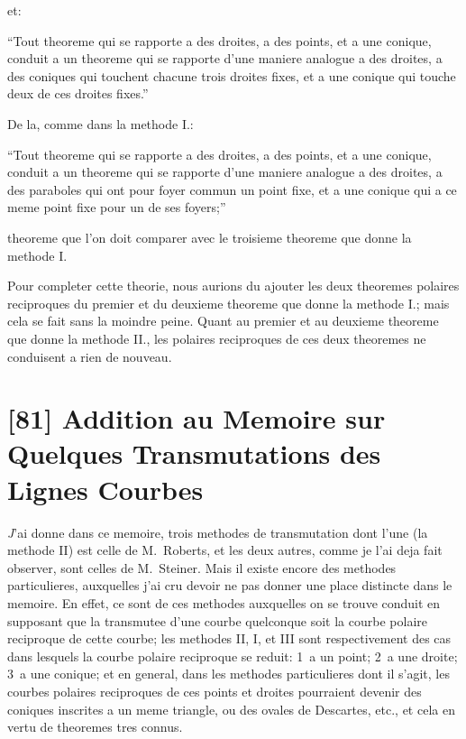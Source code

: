 \documentclass[12pt,a4paper]{article}
\begin{document}
et:

``Tout theoreme qui se rapporte a des droites, a des points, et a une conique, conduit a un theoreme qui se rapporte d'une maniere analogue a des droites, a des coniques qui touchent chacune trois droites fixes, et a une conique qui touche deux de ces droites fixes.''

De la, comme dans la methode I.:

``Tout theoreme qui se rapporte a des droites, a des points, et a une conique, conduit a un theoreme qui se rapporte d'une maniere analogue a des droites, a des paraboles qui ont pour foyer commun un point fixe, et a une conique qui a ce meme point fixe pour un de ses foyers;''

theoreme que l'on doit comparer avec le troisieme theoreme que donne la methode I.

Pour completer cette theorie, nous aurions du ajouter les deux theoremes polaires reciproques du premier et du deuxieme theoreme que donne la methode I.; mais cela se fait sans la moindre peine. Quant au premier et au deuxieme theoreme que donne la methode II., les polaires reciproques de ces deux theoremes ne conduisent a rien de nouveau.


\newpage
\section*{[81] Addition au Memoire sur Quelques Transmutations des Lignes Courbes}

\bigskip

\textit{J}'ai donne dans ce memoire, trois methodes de transmutation dont l'une (la methode II) est celle de M.~Roberts, et les deux autres, comme je l'ai deja fait observer, sont celles de M.~Steiner. Mais il existe encore des methodes particulieres, auxquelles j'ai cru devoir ne pas donner une place distincte dans le memoire. En effet, ce sont de ces methodes auxquelles on se trouve conduit en supposant que la transmutee d'une courbe quelconque soit la courbe polaire reciproque de cette courbe; les methodes II, I, et III sont respectivement des cas dans lesquels la courbe polaire reciproque se reduit: 1\textdegree\ a un point; 2\textdegree\ a une droite; 3\textdegree\ a une conique; et en general, dans les methodes particulieres dont il s'agit, les courbes polaires reciproques de ces points et droites pourraient devenir des coniques inscrites a un meme triangle, ou des ovales de Descartes, etc., et cela en vertu de theoremes tres connus.
\end{document}
